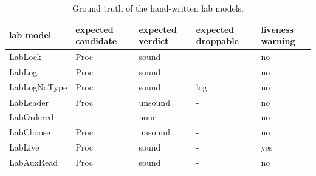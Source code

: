 \begin{table}[t]
\centering
\caption{Ground truth of the hand-written lab models.}
\label{tab:truth}
\small
\begin{tabular}{lllll}
\toprule
lab model & expected candidate & expected verdict & expected droppable & liveness warning \\
\midrule
LabLock & Proc & sound & - & no \\
LabLog & Proc & sound & - & no \\
LabLogNoType & Proc & sound & log & no \\
LabLeader & Proc & unsound & - & no \\
LabOrdered & - & none & - & no \\
LabChoose & Proc & unsound & - & no \\
LabLive & Proc & sound & - & yes \\
LabAuxRead & Proc & sound & - & no \\
\bottomrule
\end{tabular}
\end{table}
